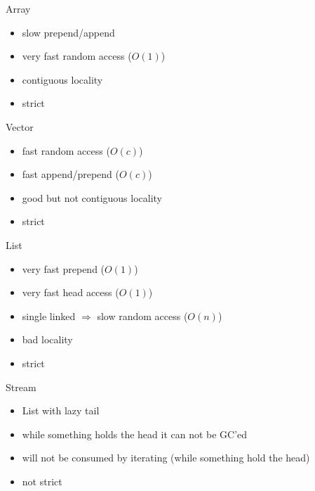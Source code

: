 \documentclass[xcolor=svgnames]{beamer}
\begin{document}
    \begin{frame}
    {Array}
        \begin{itemize}
            \item slow prepend/append
            \item very fast random access ($O(1)$)
            \item contiguous locality
            \item strict
        \end{itemize}
    \end{frame}

    \begin{frame}
    {Vector}
        \begin{itemize}
            \item fast random access ($O(c)$)
            \item fast append/prepend ($O(c)$)
            \item good but not contiguous locality
            \item strict
        \end{itemize}
    \end{frame}

    \begin{frame}
    {List}
        \begin{itemize}
            \item very fast prepend ($O(1)$)
            \item very fast head access ($O(1)$)
            \item single linked $\Rightarrow$ slow random access ($O(n)$)
            \item bad locality
            \item strict
        \end{itemize}
    \end{frame}

    \begin{frame}
    {Stream}
        \begin{itemize}
            \item List with lazy tail
            \item while something holds the head it can not be GC'ed
            \item will not be consumed by iterating (while something hold the head)
            \item not strict
        \end{itemize}
    \end{frame}
\end{document}
